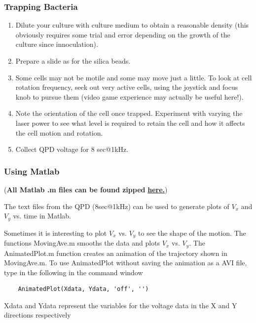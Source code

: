 \documentclass{../lab}
\begin{document}
\subsubsection{Trapping Bacteria}

\begin{enumerate}
    \item Dilute your culture with culture medium to obtain a reasonable density (this obviously requires some trial and error depending on the growth of the culture since innoculation).

    \item Prepare a slide as for the silica beads.

    \item Some cells may not be motile and some may move just a little. To look at cell rotation frequency, seek out very active cells, using the joystick and focus knob to pursue them (video game experience may actually be useful here!).

    \item Note the orientation of the cell once trapped. Experiment with varying the laser power to see what level is required to retain the cell and how it affects the cell motion and rotation.

    \item Collect QPD voltage for 8 sec@1kHz.

\end{enumerate}

\subsubsection{Using Matlab}

(\textbf{All Matlab .m files can be found zipped }\href{http://dev-physicsadv.pantheon.berkeley.edu/sites/default/files/ZIP\_files/OTZ\_Matlab\_files.zip}{\textbf{here.}})

The text files from the QPD (8sec@1kHz) can be used to generate plots of $V_x$ and $V_y$ vs. time in Matlab.

Sometimes it is interesting to plot $V_x$ vs. $V_y$ to see the shape of the motion. The functions MovingAve.m smooths the data and plots $V_x$ vs. $V_y$. The AnimatedPlot.m function creates an animation of the trajectory shown in MovingAve.m. To use AnimatedPlot without saving the animation as a AVI file, type in the following in the command window
\begin{verbatim}
    AnimatedPlot(Xdata, Ydata, 'off', '')
\end{verbatim}
Xdata and Ydata represent the variables for the voltage data in the X and Y directions respectively
\end{document}
